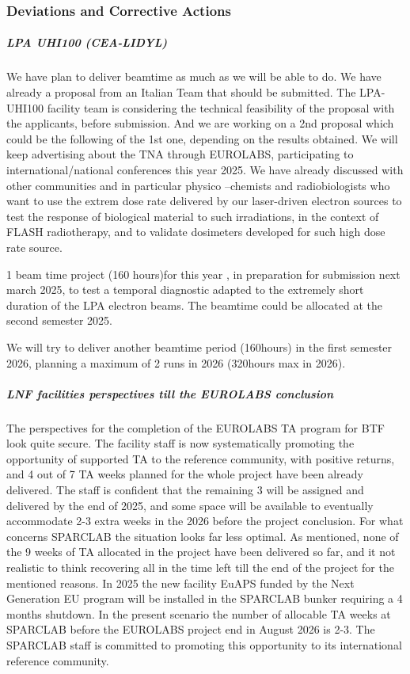{\subsubsection*{Deviations and Corrective Actions}


\subparagraph{LPA UHI100 (CEA-LIDYL)} We have plan to deliver beamtime as much as we will be able to do. We have already a proposal from an Italian Team that should be submitted. The LPA-UHI100 facility team is considering the technical feasibility of the proposal with the applicants, before submission. And we are working on a 2nd proposal which could be the following of the 1st one, depending on the results obtained. We will keep advertising about the TNA through EUROLABS, participating to international/national conferences this year 2025.  We have already discussed with other communities and in particular physico –chemists and radiobiologists who want to use the extrem dose rate delivered by our laser-driven electron sources to test the response of biological material to such irradiations, in the context of FLASH radiotherapy, and to validate dosimeters developed for such high dose rate source.  


1 beam time project (160 hours)for this year , in preparation for submission next march 2025, to test a temporal diagnostic adapted to the extremely short duration of the LPA electron beams. The beamtime could be allocated at the second semester 2025.

We will try to deliver another beamtime period (160hours) in the first semester 2026, planning a maximum of 2 runs in 2026 (320hours max in 2026).

\subparagraph{LNF facilities perspectives till the EUROLABS conclusion}

The perspectives for the completion of the EUROLABS TA program for BTF look quite secure. The facility staff is now systematically promoting the opportunity of supported TA to the reference community, with positive returns, and 4 out of 7 TA weeks planned for the whole project have been already delivered. The staff is confident that the remaining 3 will be assigned and delivered by the end of 2025, and some space will be available to eventually accommodate 2-3 extra weeks in the 2026 before the project conclusion.
For what concerns SPARCLAB the situation looks far less optimal. As mentioned, none of the 9 weeks of TA allocated in the project have been delivered so far, and it not realistic to think recovering all in the time left till the end of the project for the mentioned reasons. In 2025 the new facility EuAPS funded by the Next Generation EU program will be installed in the SPARCLAB bunker requiring a 4 months shutdown. In the present scenario the number of allocable TA weeks at SPARCLAB before the EUROLABS project end in August 2026 is 2-3. The SPARCLAB staff is committed to promoting this opportunity to its international reference community.


}
